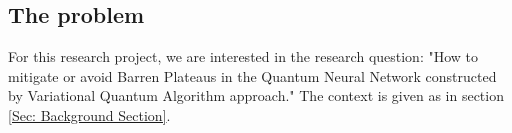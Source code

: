 \subsection{The problem}
\label{Problem Section}
For this research project, we are interested in the research question: "How to mitigate or avoid Barren Plateaus in the Quantum Neural Network constructed by Variational Quantum Algorithm approach."
The context is given as in section \ref{Sec: Background Section}.